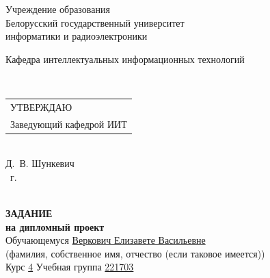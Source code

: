 {
  \thispagestyle{empty}
  \setlength{\parindent}{0em}

  \newcommand{\lineunderscore}{\uline{\hspace*{\fill}}}

  \begin{center}
    Учреждение образования\\
    Белорусский государственный университет\\
    информатики и радиоэлектроники\\[0.5em]
  

  \begin{minipage}{\textwidth}
      Кафедра интеллектуальных информационных технологий
  \end{minipage}\\[2em]

  \begin{minipage}{\textwidth}
    \begin{flushright}
      \begin{tabular}{@{}l@{}}
        УТВЕРЖДАЮ\\[0.5em]
        Заведующий кафедрой ИИТ
      \end{tabular}\\[0.7em]
      \underline{\hspace*{5.3em}} Д.~В. Шункевич\\ [0.5em]
      \underline{\hspace*{1.9em}} \underline{\hspace*{7.8em}} \the\year{}~г.
    \end{flushright}
  \end{minipage}\\[2em]

  \textbf{ЗАДАНИЕ} \\
  \textbf{на дипломный проект}\\[1em]

  Обучающемуся \uline{\hspace*{2em}}\uline{Веркович Елизавете Васильевне}\lineunderscore \\
  {\footnotesize\hspace{9em}(фамилия, собственное имя, отчество (если таковое имеется))}\\
  
  Курс \uline{4\hspace*{2em}} Учебная группа \uline{221703}\lineunderscore\\[0.5em]
  

\end{center}}
